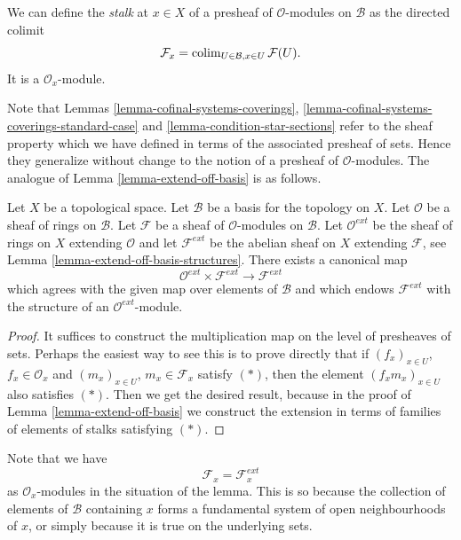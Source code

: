 \noindent
We can define the {\it stalk} at $x \in X$
of a presheaf of $\mathcal{O}$-modules on $\mathcal{B}$
as the directed colimit
$$
\mathcal{F}_x = \mathop{\mathrm{colim}}\nolimits_{U\in \mathcal{B}, x\in U} \mathcal{F}(U).
$$
It is a $\mathcal{O}_x$-module.

\medskip\noindent
Note that Lemmas \ref{lemma-cofinal-systems-coverings},
\ref{lemma-cofinal-systems-coverings-standard-case} and
\ref{lemma-condition-star-sections} refer to the sheaf
property which we have defined in terms of the associated presheaf
of sets. Hence they generalize without change to the notion
of a presheaf of $\mathcal{O}$-modules. The analogue of
Lemma \ref{lemma-extend-off-basis} is as follows.

\begin{lemma}
\label{lemma-extend-off-basis-module}
Let $X$ be a topological space.
Let $\mathcal{B}$ be a basis for the topology on $X$.
Let $\mathcal{O}$ be a sheaf of rings on $\mathcal{B}$.
Let $\mathcal{F}$ be a sheaf of $\mathcal{O}$-modules
on $\mathcal{B}$. Let $\mathcal{O}^{ext}$ be the sheaf
of rings on $X$ extending $\mathcal{O}$ and let
$\mathcal{F}^{ext}$ be the abelian sheaf on $X$ extending
$\mathcal{F}$, see Lemma \ref{lemma-extend-off-basis-structures}.
There exists a canonical map
$$
\mathcal{O}^{ext} \times \mathcal{F}^{ext}
\longrightarrow
\mathcal{F}^{ext}
$$
which agrees with the given map over elements of $\mathcal{B}$
and which endows $\mathcal{F}^{ext}$ with the structure
of an $\mathcal{O}^{ext}$-module.
\end{lemma}

\begin{proof}
It suffices to construct the multiplication map
on the level of presheaves of sets. Perhaps the easiest
way to see this is to prove directly that if
$(f_x)_{x \in U}$, $f_x \in \mathcal{O}_x$
and
$(m_x)_{x \in U}$, $m_x \in \mathcal{F}_x$
satisfy $(*)$, then the element
$(f_xm_x)_{x \in U}$ also satisfies $(*)$.
Then we get the desired result, because in the proof
of Lemma \ref{lemma-extend-off-basis} we construct the extension
in terms of families of elements of stalks satisfying $(*)$.
\end{proof}

\noindent
Note that we have
$$
\mathcal{F}_x = \mathcal{F}_x^{ext}
$$
as $\mathcal{O}_x$-modules in the situation of the lemma.
This is so because the collection of elements of $\mathcal{B}$ containing
$x$ forms a fundamental system of open neighbourhoods of $x$, or
simply because it is true on the underlying sets.

